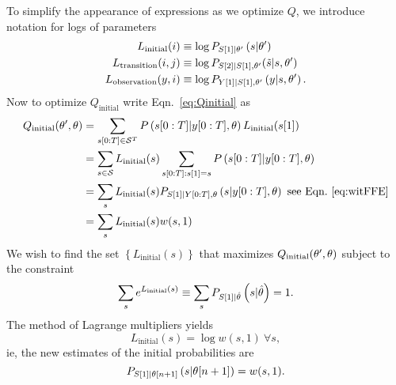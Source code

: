 To simplify the appearance of expressions as we optimize $Q$, we
introduce notation for logs of parameters
\begin{align}
  L_{\text{initial}}(i) & \equiv \log P_{{S}{[1]}|\theta'}
  \left(s|\theta' \right) \\
  L_{\text{transition}}(i,j) &\equiv \log P_{{S}{[2]} |
    {S}{[1]},\theta'}({\tilde s}|s,\theta') \\
  \label{eq:Loutput}
  L_{\text{observation}}(y,i) & \equiv \log
  P_{{Y}{[1]}|{S}{[1]},\theta'} \left(y|s,\theta' \right).
\end{align}
Now to optimize $Q_{\text{initial}}$ write Eqn.~\eqref{eq:Qinitial} as
\begin{align}
  Q_{\text{initial}} (\parameters',\parameters) &=
  \sum_{\ts{s}{0}{T}\in\states^T} P
  \left(\ts{s}{0}{T}|\ts{y}{0}{T},\parameters \right)
  L_{\text{initial}}(\ti{s}{1})\\
  &= \sum_{s \in \states} L_{\text{initial}}(s)
  \sum_{\ts{s}{0}{T}:\ti{s}{1}=s} P
  \left(\ts{s}{0}{T}|\ts{y}{0}{T},\parameters \right)\\
  &= \sum_s L_{\text{initial}}(s) P_{\ti{S}{1}|\ts{Y}{0}{T},\parameters}
  \left(s|\ts{y}{0}{T},\parameters \right) \text{ see Eqn.~\eqref{eq:witFFE}}\\
  &= \sum_s L_{\text{initial}}(s) w(s,1)
\end{align}
We wish to find the set $\left\{ L_{\text{initial}}(s) \right\}$ that
maximizes $Q_{\text{initial}} (\theta',\theta)$ subject to the
constraint
\begin{equation*}
  \sum_s e^{ L_{\text{initial}}(s)} \equiv\sum_s
  P_{{S}{[1]}|\hat {\theta}} \left(s|\hat {\theta} \right) = 1.
\end{equation*}
The method of Lagrange multipliers yields
\begin{equation}
  \label{eq:LiSol}
   L_{\text{initial}}(s) = \log w(s,1) ~ \forall s,
\end{equation}
ie, the new estimates of the initial probabilities are
\begin{equation}
  \label{eq:InitialRe}
  P_{{S}{[1]}|{\theta}{[n+1]}} \left(s|{\theta}{[n+1]} \right) = w(s,1).
\end{equation}


